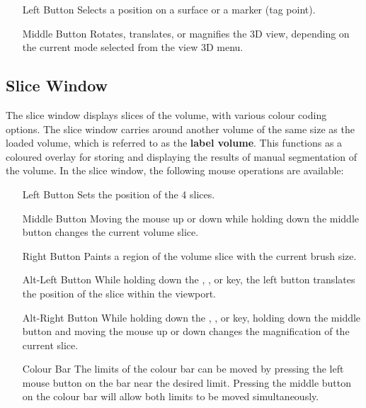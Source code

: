 \begin{itemize}
\item[Left Button]  Selects a position on a surface or a marker (tag point).
\item[Middle Button]  Rotates, translates, or magnifies the 3D view, depending
                      on the current mode selected from the view 3D menu.
\end{itemize}

\subsection{Slice Window}

The slice window displays slices of the volume, with various colour coding
options.  The slice window carries around another volume of the same size
as the loaded volume, which is referred to as the {\bf label volume}.
This functions as a coloured overlay for storing and displaying the results
of manual segmentation of the volume.
In the slice window, the following mouse operations are available:

\begin{itemize}
\item[Left Button]  Sets the position of the 4 slices.
\item[Middle Button]  Moving the mouse up or down while holding down the
                      middle button changes the current volume slice.
\item[Right Button]  Paints a region of the volume slice with the current
                     brush size.
\item[Alt-Left Button]  While holding down the , ,
                        or  key, the left button translates the
                        position of the slice within the viewport.
\item[Alt-Right Button]  While holding down the , ,
                        or  key, holding down the middle button
                        and moving the mouse up or down changes the
                        magnification of the current slice.
\item[Colour Bar]  The limits of the colour bar can be moved by pressing
                   the left mouse button on the bar near the desired limit.
                   Pressing the middle button on the colour bar will allow
                   both limits to be moved simultaneously.
\end{itemize}

